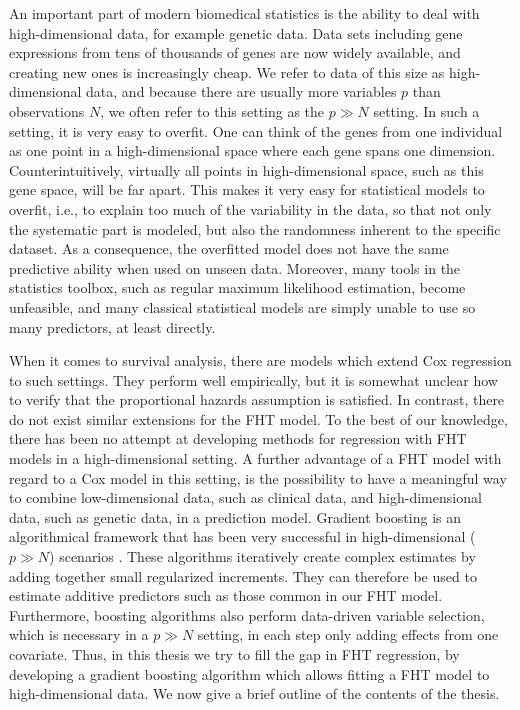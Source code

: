 An important part of modern biomedical statistics is the ability to deal with high-dimensional data, for example genetic data.
Data sets including gene expressions from tens of thousands of genes are now widely available, and creating new ones is increasingly cheap.
We refer to data of this size as high-dimensional data, and because there are usually more variables $p$ than observations $N$, we often refer to this setting as the $p\gg N$ setting.
In such a setting, it is very easy to overfit.
One can think of the genes from one individual as one point in a high-dimensional space where each gene spans one dimension.
Counterintuitively, virtually all points in high-dimensional space, such as this gene space, will be far apart.
This makes it very easy for statistical models to overfit, i.e., to explain too much of the variability in the data, so that not only the systematic part is modeled, but also the randomness inherent to the specific dataset.
As a consequence, the overfitted model does not have the same predictive ability when used on unseen data.
Moreover, many tools in the statistics toolbox, such as regular maximum likelihood estimation, become unfeasible, and many classical statistical models are simply unable to use so many predictors, at least directly.

When it comes to survival analysis, there are models which extend Cox regression to such settings.
They perform well empirically, but it is somewhat unclear how to verify that the proportional hazards assumption is satisfied.
In contrast, there do not exist similar extensions for the FHT model.
To the best of our knowledge, there has been no attempt at developing methods for regression with FHT models in a high-dimensional setting.
A further advantage of a FHT model with regard to a Cox model in this setting, is the possibility to have a meaningful way to combine low-dimensional data, such as clinical data, and high-dimensional data, such as genetic data, in a prediction model.
Gradient boosting \citep{friedman2001} is an algorithmical framework that has been very successful in high-dimensional ($p\gg N$) scenarios \citep{buhlmann-yu, mayr14a, mayr17}.
These algorithms iteratively create complex estimates by adding together small regularized increments.
They can therefore be used to estimate additive predictors such as those common in our FHT model.
Furthermore, boosting algorithms also perform data-driven variable selection, which is necessary in a $p\gg N$ setting, in each step only adding effects from one covariate.
Thus, in this thesis we try to fill the gap in FHT regression, by developing a gradient boosting algorithm which allows fitting a FHT model to high-dimensional data.
We now give a brief outline of the contents of the thesis.

